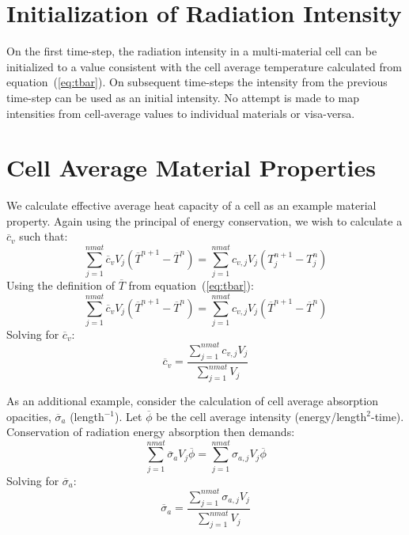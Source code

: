 \documentclass[12pt]{article}
\begin{document}
\section{Initialization of Radiation Intensity}

On the first time-step, the radiation intensity in a multi-material cell
can be initialized to a value consistent
with the cell average temperature calculated from equation~(\ref{eq:tbar}).
 On subsequent time-steps the intensity
from the previous time-step can be used as an initial intensity.
No attempt is made to map intensities from cell-average values to
individual materials or visa-versa.

\section{Cell Average Material Properties}

We calculate effective average heat capacity of a cell as an example
material property. Again using the principal of energy conservation, 
we wish to calculate a $\overline{c}_{v}$ such that:
\begin{equation}
\sum_{j=1}^{nmat} \overline{c}_{v}  V_{j} 
(\overline{T}^{n+1}-\overline{T}^{n})   = 
\sum_{j=1}^{nmat} c_{v,j} V_{j} (T_{j}^{n+1}-T_{j}^{n})
\end{equation}
Using the definition of $\overline{T}$ from equation~(\ref{eq:tbar}):
\begin{equation}
\sum_{j=1}^{nmat}  \overline{c}_{v} V_{j}  
(\overline{T}^{n+1}-\overline{T}^{n})   = 
 \sum_{j=1}^{nmat} c_{v,j} V_{j} (\overline{T}^{n+1}-\overline{T}^{n})
\end{equation}
Solving for $\overline{c}_{v}$:
\begin{equation}
\overline{c}_{v} = \frac{ \sum_{j=1}^{nmat} c_{v,j} V_{j} } 
{\sum_{j=1}^{nmat} V_{j}}
\label{eq:cvbar}
\end{equation}


As an additional example, consider the calculation of cell average absorption
opacities, $\overline{\sigma}_a$ (length$^{-1}$).
 Let $\overline{\phi}$ be the cell 
average intensity (energy/length$^2$-time). Conservation of radiation
energy absorption then demands:
\begin{equation}
 \sum_{j=1}^{nmat} \overline{\sigma}_a V_j \overline{\phi} =
\sum_{j=1}^{nmat} \sigma_{a,j} V_j \overline{\phi}
\end{equation}
Solving for $\overline{\sigma}_a$:
\begin{equation}
\overline{\sigma}_{a} = \frac{ \sum_{j=1}^{nmat} \sigma_{a,j} V_{j} } 
{\sum_{j=1}^{nmat} V_{j}}
\end{equation}
\end{document}
